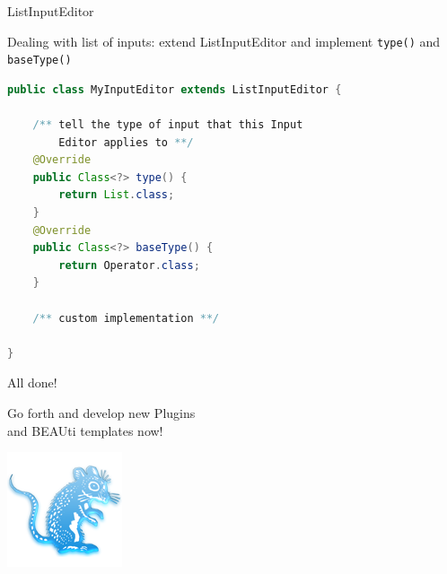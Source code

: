 \documentclass{beamer}
\theoremstyle{definition}
\begin{document}
\begin{frame}[containsverbatim]{ListInputEditor}

Dealing with list of inputs: extend ListInputEditor
and implement {\tt type()} and {\tt baseType()}

\begin{lstlisting}[language=java]
public class MyInputEditor extends ListInputEditor {

    /** tell the type of input that this Input 
        Editor applies to **/
	@Override
	public Class<?> type() {
		return List.class;
	}
	@Override
	public Class<?> baseType() {
		return Operator.class;
	}

    /** custom implementation **/

} 
\end{lstlisting}

\end{frame}


\begin{frame}[containsverbatim]{All done!}

Go forth and develop new Plugins \\and BEAUti templates now!\vskip1cm

\begin{center}
\includegraphics{../../src/beast/app/draw/icons/beast.png}
\end{center}
\end{frame}

\fi
\end{document}
